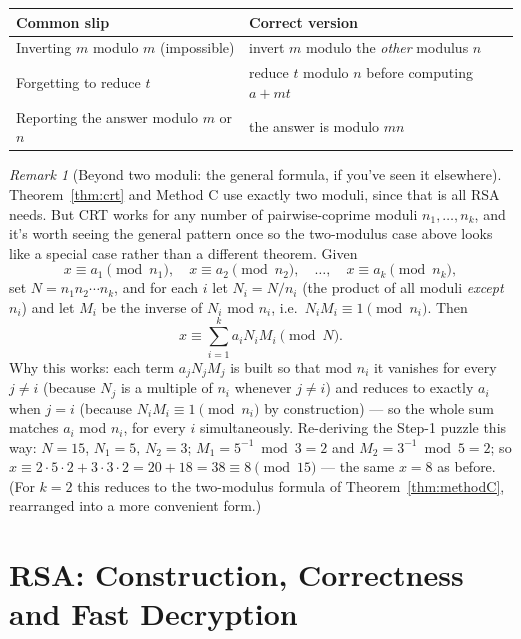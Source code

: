 \documentclass[11pt]{article}
\theoremstyle{definition}
\theoremstyle{remark}
\newtheorem{remark}[theorem]{Remark}
\begin{document}
\begin{center}
\renewcommand{\arraystretch}{1.3}
\begin{tabular}{ll}
\toprule
\textbf{Common slip} & \textbf{Correct version} \\
\midrule
Inverting $m$ modulo $m$ (impossible) & invert $m$ modulo the \emph{other} modulus $n$ \\
Forgetting to reduce $t$ & reduce $t$ modulo $n$ before computing $a+mt$ \\
Reporting the answer modulo $m$ or $n$ & the answer is modulo $mn$ \\
\bottomrule
\end{tabular}
\end{center}

\begin{remark}[Beyond two moduli: the general formula, if you've seen it elsewhere]
Theorem~\ref{thm:crt} and Method C use exactly two moduli, since that is all RSA needs. But CRT works for any number of pairwise-coprime moduli $n_1,\dots,n_k$, and it's worth seeing the general pattern once so the two-modulus case above looks like a special case rather than a different theorem. Given
\[
x\equiv a_1\pmod{n_1}, \quad x\equiv a_2\pmod{n_2}, \quad \ldots, \quad x\equiv a_k\pmod{n_k},
\]
set $N=n_1n_2\cdots n_k$, and for each $i$ let $N_i=N/n_i$ (the product of all moduli \emph{except} $n_i$) and let $M_i$ be the inverse of $N_i$ mod $n_i$, i.e.\ $N_iM_i\equiv1\pmod{n_i}$. Then
\[
x\equiv\sum_{i=1}^k a_iN_iM_i \pmod N.
\]
Why this works: each term $a_jN_jM_j$ is built so that mod $n_i$ it vanishes for every $j\ne i$ (because $N_j$ is a multiple of $n_i$ whenever $j\ne i$) and reduces to exactly $a_i$ when $j=i$ (because $N_iM_i\equiv1\pmod{n_i}$ by construction) — so the whole sum matches $a_i$ mod $n_i$, for every $i$ simultaneously. Re-deriving the Step-1 puzzle this way: $N=15$, $N_1=5,\,N_2=3$; $M_1=5^{-1}\bmod3=2$ and $M_2=3^{-1}\bmod5=2$; so $x\equiv2\cdot5\cdot2+3\cdot3\cdot2=20+18=38\equiv8\pmod{15}$ — the same $x=8$ as before. (For $k=2$ this reduces to the two-modulus formula of Theorem~\ref{thm:methodC}, rearranged into a more convenient form.)
\end{remark}



\newpage
\section{RSA: Construction, Correctness and Fast Decryption}\label{sec:rsa}
\end{document}
